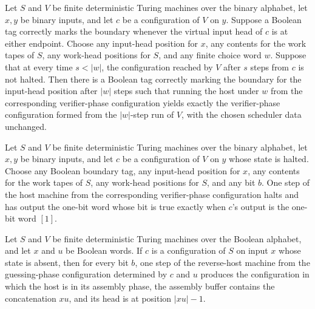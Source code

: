 \begin{lemma}
\label{Complexity.b2_verify_run}
\leanok
{}
Let $S$ and $V$ be finite deterministic Turing machines over the binary alphabet, let
$x,y$ be binary inputs, and let $c$ be a configuration of $V$ on $y$. Suppose a Boolean
tag correctly marks the boundary whenever the virtual input head of $c$ is at either
endpoint. Choose any input-head position for $x$, any contents for the work tapes of
$S$, any work-head positions for $S$, and any finite choice word $w$. Suppose that at
every time $s<|w|$, the configuration reached by $V$ after $s$ steps from $c$ is not
halted. Then there is a Boolean tag correctly marking the boundary for the input-head
position after $|w|$ steps such that running the host under $w$ from the corresponding
verifier-phase configuration yields exactly the verifier-phase configuration formed from
the $|w|$-step run of $V$, with the chosen scheduler data unchanged.
\end{lemma}

\begin{lemma}
\label{Complexity.b2_verify_finish}
\leanok
{}
Let $S$ and $V$ be finite deterministic Turing machines over the binary alphabet, let
$x,y$ be binary inputs, and let $c$ be a configuration of $V$ on $y$ whose state is
halted. Choose any Boolean boundary tag, any input-head position for $x$, any contents
for the work tapes of $S$, any work-head positions for $S$, and any bit $b$. One step of
the host machine from the corresponding verifier-phase configuration halts and has
output the one-bit word whose bit is true exactly when $c$'s output is the one-bit word
$[1]$.
\end{lemma}

\begin{lemma}
\label{Complexity.b2_guess_return}
\leanok
{}
Let $S$ and $V$ be finite deterministic Turing machines over the Boolean alphabet, and
let $x$ and $u$ be Boolean words. If $c$ is a configuration of $S$ on input $x$ whose
state is absent, then for every bit $b$, one step of the reverse-host machine from the
guessing-phase configuration determined by $c$ and $u$ produces the configuration in
which the host is in its assembly phase, the assembly buffer contains the concatenation
$xu$, and its head is at position $|xu|-1$.
\end{lemma}


